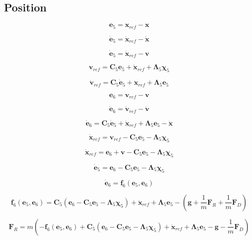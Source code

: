 \subsection{Position}

\[
\mathbf{e}_5 = \mathbf{x}_{ref} - \mathbf{x}
\]

\[
\dot{\mathbf{e}}_5 = \dot{\mathbf{x}}_{ref} - \dot{\mathbf{x}}
\]

\[
\dot{\mathbf{e}}_5 = \dot{\mathbf{x}}_{ref} - \mathbf{v}
\]

\[
\mathbf{v}_{ref} = \mathbf{C}_5 \mathbf{e}_5 + \dot{\mathbf{x}}_{ref} + \boldsymbol\Lambda_5 \boldsymbol\chi_5
\]

\[
\dot{\mathbf{v}}_{ref} = \mathbf{C}_5 \dot{\mathbf{e}}_5 + \ddot{\mathbf{x}}_{ref} + \boldsymbol\Lambda_5 \mathbf{e}_5
\]


\[
\mathbf{e}_6 = \mathbf{v}_{ref} - \mathbf{v}
\]

\[
\dot{\mathbf{e}}_6 = \dot{\mathbf{v}}_{ref} - \dot{\mathbf{v}}
\]

\[
\dot{\mathbf{e}}_6 = \mathbf{C}_5 \dot{\mathbf{e}}_5 + \ddot{\mathbf{x}}_{ref} + \boldsymbol\Lambda_5 \mathbf{e}_5 - \ddot{\mathbf{x}}
\]

\[
\dot{\mathbf{x}}_{ref} = \mathbf{v}_{ref} - \mathbf{C}_5 \mathbf{e}_5 - \boldsymbol\Lambda_5 \boldsymbol\chi_5
\]

\[
\dot{\mathbf{x}}_{ref} = \mathbf{e}_6 + \mathbf{v} - \mathbf{C}_5 \mathbf{e}_5 - \boldsymbol\Lambda_5 \boldsymbol\chi_5
\]

\[
\dot{\mathbf{e}}_5 = \mathbf{e}_6 - \mathbf{C}_5 \mathbf{e}_5 - \boldsymbol\Lambda_5 \boldsymbol\chi_5
\]

\[
\dot{\mathbf{e}}_6 = \mathbf{f}_6(\mathbf{e}_5,\mathbf{e}_6)
\]

\[
\mathbf{f}_6(\mathbf{e}_5,\mathbf{e}_6)
= \mathbf{C}_5 \left( \mathbf{e}_6 - \mathbf{C}_5 \mathbf{e}_5 - \boldsymbol\Lambda_5 \boldsymbol\chi_5 \right)
+ \ddot{\mathbf{x}}_{ref}
+ \boldsymbol\Lambda_5 \mathbf{e}_5
- \left(
\mathbf{g}
+ \frac{1}{m} \mathbf{F}_{R}
+ \frac{1}{m} \mathbf{F}_{D}
\right)
\]

\[
\mathbf{F}_{R}
= m \left(
-\mathbf{f}_6(\mathbf{e}_5,\mathbf{e}_6)
+ \mathbf{C}_5 \left( \mathbf{e}_6 - \mathbf{C}_5 \mathbf{e}_5 - \boldsymbol\Lambda_5 \boldsymbol\chi_5 \right)
+ \ddot{\mathbf{x}}_{ref}
+ \boldsymbol\Lambda_5 \mathbf{e}_5
- \mathbf{g}
- \frac{1}{m} \mathbf{F}_{D}
\right)
\]



